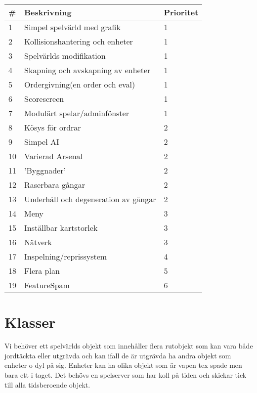 \documentclass[a4paper,8pt]{article}
\begin{document}
\begin{tabular}{|l |l |l|}
  \hline
 \bfseries \# &\bfseries Beskrivning &\bfseries Prioritet \\ 
  \hline
  1 & Simpel spelvärld med grafik & 1 \\  
  \hline
  2 & Kollisionshantering och enheter & 1 \\
  \hline
  3 & Spelvärlds modifikation & 1 \\
  \hline
  4 & Skapning och avskapning av enheter & 1 \\
  \hline
  5 & Ordergivning(en order och eval) & 1 \\
  \hline
  6 & Scorescreen & 1 \\
  \hline
  7 & Modulärt spelar/adminfönster & 1 \\
  \hline
  8 & Kösys för ordrar & 2 \\
  \hline
  9 & Simpel AI & 2 \\
  \hline
  10 & Varierad Arsenal & 2 \\
  \hline
  11 & 'Byggnader' & 2 \\
  \hline
  12 & Raserbara gångar & 2 \\
  \hline
  13 & Underhåll och degeneration av gångar & 2 \\
  \hline
  14 & Meny & 3 \\
  \hline
  15 & Inställbar kartstorlek & 3 \\
  \hline
  16 & Nätverk & 3 \\
  \hline
  17 & Inspelning/reprissystem & 4 \\
  \hline
  18 & Flera plan & 5 \\
  \hline
  19 & FeatureSpam & 6 \\

  \hline
\end{tabular}


\section{Klasser}
Vi behöver ett spelvärlds objekt som innehåller flera rutobjekt som kan vara
både jordtäckta eller utgrävda och kan ifall de är utgrävda ha andra objekt
som enheter o dyl på sig. Enheter kan ha olika objekt som är vapen tex spade 
men bara ett i taget. Det behövs en spelserver som har koll på tiden och
skickar tick till alla tidsberoende objekt.
\end{document}
